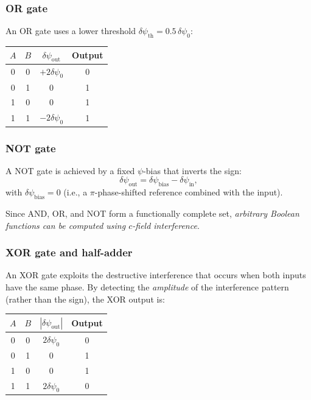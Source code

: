 \documentclass[aps,prd,twocolumn,superscriptaddress,nofootinbib,floatfix]{revtex4-2}
\newcommand{\psifield}{\psi}
\begin{document}
\subsubsection{OR gate}

An OR gate uses a lower threshold
$\delta\psifield_{\text{th}} = 0.5\,\delta\psifield_0$:

\begin{center}
\begin{tabular}{cc|c|c}
$A$ & $B$ & $\delta\psifield_{\text{out}}$ & Output \\
\hline
0 & 0 & $+2\delta\psifield_0$ & 0 \\
0 & 1 & $0$ & 1 \\
1 & 0 & $0$ & 1 \\
1 & 1 & $-2\delta\psifield_0$ & 1 \\
\end{tabular}
\end{center}

\subsubsection{NOT gate}

A NOT gate is achieved by a fixed $\psifield$-bias that inverts
the sign:
\begin{equation}
\delta\psifield_{\text{out}} = \delta\psifield_{\text{bias}}
- \delta\psifield_{\text{in}},
\label{eq:NOT_gate}
\end{equation}
with $\delta\psifield_{\text{bias}} = 0$ (i.e., a
$\pi$-phase-shifted reference combined with the input).

Since AND, OR, and NOT form a functionally complete set,
\emph{arbitrary Boolean functions can be computed using
$c$-field interference}.

\subsubsection{XOR gate and half-adder}

An XOR gate exploits the destructive interference that occurs when
both inputs have the same phase. By detecting the
\emph{amplitude} of the interference pattern (rather than the
sign), the XOR output is:

\begin{center}
\begin{tabular}{cc|c|c}
$A$ & $B$ & $|\delta\psifield_{\text{out}}|$ & Output \\
\hline
0 & 0 & $2\delta\psifield_0$ & 0 \\
0 & 1 & $0$ & 1 \\
1 & 0 & $0$ & 1 \\
1 & 1 & $2\delta\psifield_0$ & 0 \\
\end{tabular}
\end{center}
\end{document}
